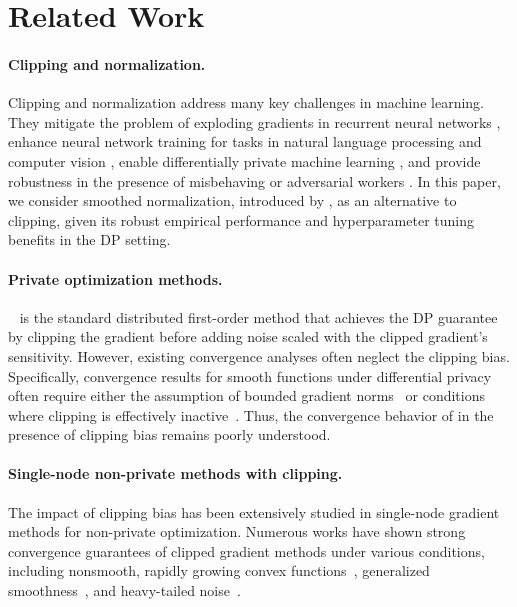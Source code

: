 \section{Related Work}
\label{sec:related_work}

\paragraph{Clipping and normalization.} 
Clipping and normalization
address many key challenges in machine learning. 
They mitigate the problem of exploding gradients in recurrent neural networks \citep{pascanu2013difficulty}, enhance neural network training for tasks in natural language processing \citep{merity2017regularizing,brown2020language} and computer vision \citep{brock2021high}, enable differentially private machine learning \citep{abadi2016deep,mcmahan2018learning}, and provide robustness in the presence of misbehaving or adversarial workers \citep{karimireddy2021learning,ozfatura2023byzantines,malinovsky2023byzantine}. 
In this paper, we consider smoothed normalization, introduced by \citet{yang2022normalized, bu2024automatic}, as an alternative to clipping, given its robust empirical performance and hyperparameter tuning benefits in the DP setting.

\paragraph{Private optimization methods.} 
~\citep{abadi2016deep} is the standard distributed first-order method that achieves the DP guarantee by clipping  the gradient
before adding noise scaled with the clipped gradient's sensitivity. 
However, existing  convergence analyses often neglect the clipping bias. 
Specifically, convergence results for smooth functions under differential privacy often require either the assumption of bounded gradient norms~\citep{zhang2020private,li2022soteriafl,zhang2022understanding,pmlr-v216-wang23b,lowy2023private, murata2023diff2, wang2024efficient} or conditions where clipping is effectively inactive~\citep{zhang2024private,noble2022differentially}. 
Thus, the convergence behavior of  in the presence of clipping bias remains poorly understood.


\paragraph{Single-node non-private methods with clipping. } 
The impact of clipping bias has been extensively studied in single-node gradient methods for non-private optimization. 
Numerous works have shown strong convergence guarantees of clipped gradient methods under various conditions, including nonsmooth, rapidly growing convex functions~\citet{shor2012minimization,ermoliev1988stochastic,alber1998projected}, generalized smoothness~\citep{zhang2019gradient,koloskova2023revisiting,gorbunov2024methods,vankov2024optimizing,lobanov2024linear,hubler2024parameter}, and heavy-tailed noise~\citep{gorbunov2020stochastic,nguyen2023improved,gorbunov2024highprobability,hubler2024gradient,chezhegov2024gradient}.


